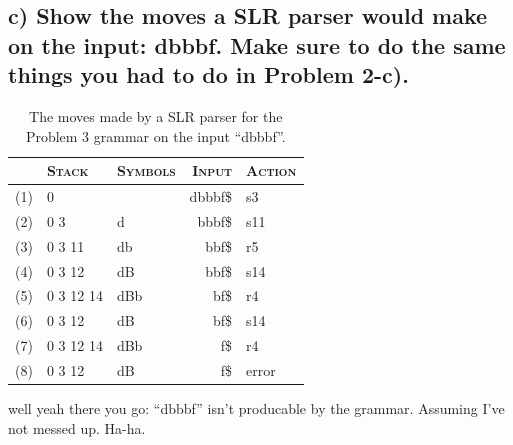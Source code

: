 \subsection{c) Show the moves a SLR parser would make on the input: \textbf{dbbbf}. Make sure to do the same things you had to do in Problem 2-c).}


\begin{table}[H]
\centering
\begin{tabular}{r|l|l|r|l} %
	\hline \hline
	& \textsc{Stack} & \textsc{Symbols} & \textsc{Input} & \textsc{Action} \\ \hline
	(1)  & 0        &               & dbbbf\$   & s3	\\
	(2)	 & 0 3		& d				& bbbf\$	& s11	\\
	(3)	 & 0 3 11	& db			& bbf\$		& r5	\\
	(4)	 & 0 3 12	& dB			& bbf\$		& s14 	\\
	(5)	 & 0 3 12 14& dBb			& bf\$		& r4	\\
	(6)	 & 0 3 12	& dB			& bf\$		& s14	\\
	(7)	 & 0 3 12 14& dBb			& f\$		& r4	\\
	(8)	 & 0 3 12	& dB			& f\$		& error \\
\end{tabular}
\caption{The moves made by a SLR parser for the Problem 3 grammar on the input ``dbbbf''.}
\label{tab:3-c}
\end{table}

well yeah there you go: ``dbbbf'' isn't producable by the grammar.
Assuming I've not messed up.
Ha-ha.
